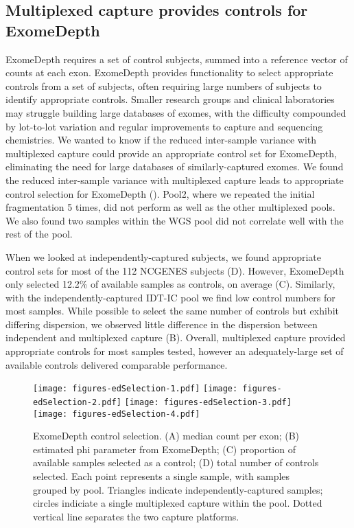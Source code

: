 \documentclass{article}\usepackage[]{graphicx}\usepackage[]{color}
\begin{document}
\subsection{Multiplexed capture provides controls for ExomeDepth}

ExomeDepth requires a set of control subjects, summed into a reference vector of counts at each exon.
ExomeDepth provides functionality to select appropriate controls from a set of subjects, often requiring large numbers of subjects to identify appropriate controls.
Smaller research groups and clinical laboratories may struggle building large databases of exomes, with the difficulty compounded by lot-to-lot variation and regular improvements to capture and sequencing chemistries.
We wanted to know if the reduced inter-sample variance with multiplexed capture could provide an appropriate control set for ExomeDepth, eliminating the need for large databases of similarly-captured exomes.
We found the reduced inter-sample variance with multiplexed capture leads to appropriate control selection for ExomeDepth ().
Pool2, where we repeated the initial fragmentation 5 times, did not perform as well as the other multiplexed pools.
We also found two samples within the WGS pool did not correlate well with the rest of the pool.

When we looked at independently-captured subjects, we found appropriate control sets for most of the 112 NCGENES subjects (D).
However, ExomeDepth only selected 12.2\% of available samples as controls, on average (C).
Similarly, with the independently-captured IDT-IC pool we find low control numbers for most samples.
While possible to select the same number of controls but exhibit differing dispersion, we observed little difference in the dispersion between independent and multiplexed capture (B).
Overall, multiplexed capture provided appropriate controls for most samples tested, however an adequately-large set of available controls delivered comparable performance.

\begin{figure}
  \centering
  \texttt{[image: figures-edSelection-1.pdf]}%
  \texttt{[image: figures-edSelection-2.pdf]}
  \texttt{[image: figures-edSelection-3.pdf]}%
  \texttt{[image: figures-edSelection-4.pdf]}
  \caption{ExomeDepth control selection. (A) median count per exon; (B) estimated phi parameter from ExomeDepth; (C) proportion of available samples selected as a control; (D) total number of controls selected. Each point represents a single sample, with samples grouped by pool. Triangles indicate independently-captured samples; circles indiciate a single multiplexed capture within the pool. Dotted vertical line separates the two capture platforms.}
  \label{fig:edSelection}
\end{figure}
\end{document}
